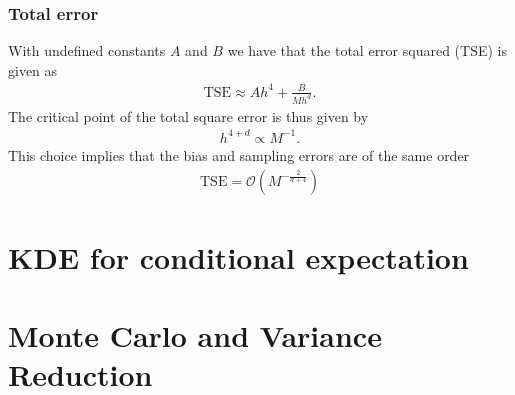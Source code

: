 \documentclass[a4paper,11pt]{article}
\newcommand{\parent}[1]{\left( {#1} \right)}
\newcommand{\bigo}[1]{\mathcal O \parent{{#1}}}
\begin{document}
\subsubsection*{Total error}
With undefined constants $A$ and $B$ we have that the 
total error squared (TSE) is given as
\begin{align}
\mathrm{TSE} \approx A h^4 + \frac{B}{Mh^d}.
\end{align}
The critical point of the total square error
is thus given by
\begin{align}
h^{4+d} \propto M^{-1}.
\end{align}
This choice implies that the bias and sampling errors are of the same order
\begin{align}
\mathrm{TSE} = \bigo{M^{-\frac{2}{d+4}}}
\end{align}

\section*{KDE for conditional expectation}

\section*{Monte Carlo and Variance Reduction}
\end{document}
